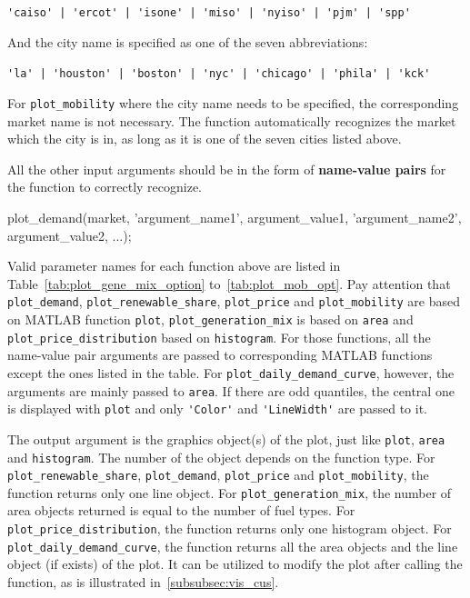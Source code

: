 \documentclass[11pt]{article}
\newcommand{\matlab}{\textsc{MATLAB}}
\numberwithin{equation}{section}
\numberwithin{table}{section}
\numberwithin{figure}{section}
\begin{document}
\begin{center}
  \verb!'caiso' | 'ercot' | 'isone' | 'miso' | 'nyiso' | 'pjm' | 'spp'!
\end{center}

And the city name is specified as one of the seven abbreviations:

\begin{center}
  \verb!'la' | 'houston' | 'boston' | 'nyc' | 'chicago' | 'phila' | 'kck'!
\end{center}

For \verb!plot_mobility! where the city name needs to be specified, the corresponding market name is not necessary. The function automatically recognizes the market which the city is in, as long as it is one of the seven cities listed above.

All the other input arguments should be in the form of \textbf{name-value pairs} for the function to correctly recognize.

\begin{Code}
  plot_demand(market, 'argument_name1', argument_value1,
  'argument_name2', argument_value2, ...);
\end{Code}

Valid parameter names for each function above are listed in Table~\ref{tab:plot_gene_mix_option} to~\ref{tab:plot_mob_opt}. Pay attention that \verb!plot_demand!, \verb!plot_renewable_share!, \verb!plot_price! and \verb!plot_mobility! are based on \matlab{} function \verb!plot!, \verb!plot_generation_mix! is based on \verb!area! and \verb!plot_price_distribution! based on \verb!histogram!. For those functions, all the name-value pair arguments are passed to corresponding \matlab{} functions except the ones listed in the table. For \verb!plot_daily_demand_curve!, however, the arguments are mainly passed to \verb!area!. If there are odd quantiles, the central one is displayed with \verb!plot! and only \verb!'Color'! and \verb!'LineWidth'! are passed to it.

The output argument is the graphics object(s) of the plot, just like \verb!plot!, \verb!area! and \verb!histogram!. The number of the object depends on the function type. For \verb!plot_renewable_share!, \verb!plot_demand!, \verb!plot_price! and \verb!plot_mobility!, the function returns only one line object. For \verb!plot_generation_mix!, the number of area objects returned is equal to the number of fuel types. For \verb!plot_price_distribution!, the function returns only one histogram object. For \verb!plot_daily_demand_curve!, the function returns all the area objects and the line object (if exists) of the plot. It can be utilized to modify the plot after calling the function, as is illustrated in~\ref{subsubsec:vis_cus}.
\end{document}
